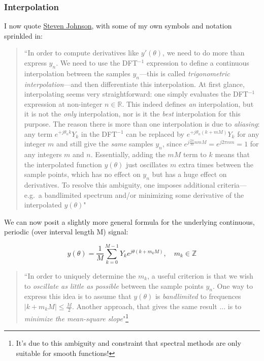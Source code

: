 \documentclass[10pt]{article}
\begin{document}
\subsubsection{Interpolation}

I now quote \href{https://math.mit.edu/~stevenj/fft-deriv.pdf}{Steven Johnson}\cite{johnson}, with some of my own symbols and notation sprinkled in:

\begin{quotation}
``In order to compute derivatives like $y'(\theta)$, we need to do more than express $y_n$. We need to use the DFT$^{-1}$ expression to define a continuous interpolation between the samples $y_n$---this is called \textit{trigonometric interpolation}---and then differentiate this interpolation. At first glance, interpolating seems very straightforward: one simply evaluates the DFT$^{-1}$ expression at non-integer $n \in \mathbb{R}$. This indeed defines \textit{an} interpolation, but it is not the \textit{only} interpolation, nor is it the \textit{best} interpolation for this purpose. The reason there is more than one interpolation is due to \textit{aliasing}: any term $e^{+j \theta_n k} Y_k$ in the DFT$^{-1}$ can be replaced by $e^{+j \theta_n (k + mM)} Y_k$ for any integer $m$ and still give the \textit{same} samples $y_n$, since $e^{j \frac{2\pi}{M} nmM} = e^{j2\pi nm} = 1$ for any integers $m$ and $n$. Essentially, adding the $mM$ term to $k$ means that the interpolated function $y(\theta)$ just oscillates $m$ extra times between the sample points, which has no effect on $y_n$ but has a huge effect on derivatives. To resolve this ambiguity, one imposes additional criteria---e.g.~a bandlimited spectrum and/or minimizing some derivative of the interpolated $y(\theta)$"
\end{quotation}

We can now posit a slightly more general formula for the underlying continuous, periodic (over interval length M) signal:

$$ y(\theta) = \frac{1}{M} \sum_{k=0}^{M-1} Y_k e^{j \theta (k + m_k M)}, \quad m_k \in \mathbb{Z} $$

\begin{quotation}
``In order to uniquely determine the $m_k$, a useful criterion is that we wish to \textit{oscillate as little as possible} between the sample points $y_n$. One way to express this idea is to assume that $y(\theta)$ is \textit{bandlimited} to frequences $|k + m_k M| \leq \frac{M}{2}$. Another approach, that gives the same result ... is to \textit{minimize the mean-square slope}"\footnote{It's due to this ambiguity and constraint that spectral methods are only suitable for smooth functions!}
\end{quotation}
\end{document}

